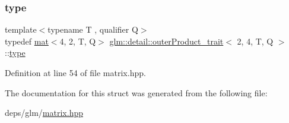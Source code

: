 \subsubsection{\texorpdfstring{type}{type}}
{\footnotesize\ttfamily template$<$typename T , qualifier Q$>$ \\
typedef \hyperlink{structglm_1_1mat}{mat}$<$4, 2, T, Q$>$ \hyperlink{structglm_1_1detail_1_1outerProduct__trait}{glm\+::detail\+::outer\+Product\+\_\+trait}$<$ 2, 4, T, Q $>$\+::\hyperlink{structglm_1_1mat_3_014_00_012_00_01T_00_01Q_01_4}{type}}



Definition at line 54 of file matrix.\+hpp.



The documentation for this struct was generated from the following file\+:\begin{DoxyCompactItemize}
\item 
deps/glm/\hyperlink{matrix_8hpp}{matrix.\+hpp}\end{DoxyCompactItemize}
